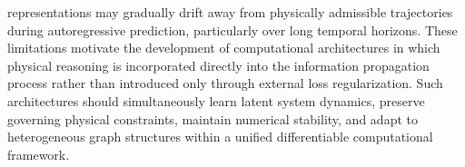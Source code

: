 representations may gradually drift away from physically admissible trajectories during autoregressive prediction, particularly over long temporal horizons. These limitations motivate the development of computational architectures in which physical reasoning is incorporated directly into the information propagation process rather than introduced only through external loss regularization. Such architectures should simultaneously learn latent system dynamics, preserve governing physical constraints, maintain numerical stability, and adapt to heterogeneous graph structures within a unified differentiable computational framework. \] 
